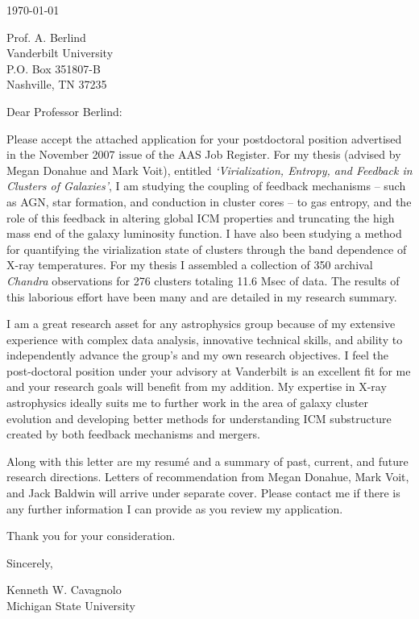 \documentclass[11pt]{article}
\begin{document}
\today

Prof. A. Berlind\\
Vanderbilt University\\
P.O. Box 351807-B\\
Nashville, TN 37235

Dear Professor Berlind:

Please accept the attached application for your postdoctoral
position advertised in the November 2007 issue of the AAS Job
Register. For my thesis (advised by Megan Donahue and  Mark Voit),
entitled {\it `Virialization, Entropy, and Feedback in Clusters of
Galaxies'}, I am studying the coupling of feedback mechanisms -- such
as AGN, star formation, and conduction in cluster cores -- to gas
entropy, and the role of this feedback in altering global ICM
properties and truncating the high mass end of the galaxy luminosity
function. I have also been studying a method for quantifying the
virialization state of clusters through the band dependence of X-ray
temperatures. For my thesis I assembled a collection of 350 archival
{\textit{Chandra}} observations for 276 clusters totaling 11.6 Msec of
data. The results of this laborious effort have been many and are
detailed in my research summary.

I am a great research asset for any astrophysics group because of my
extensive experience with complex data analysis, innovative technical
skills, and ability to independently advance the group's and my own
research objectives. I feel the post-doctoral position under your
advisory at Vanderbilt is an excellent fit for me and your research
goals will benefit from my addition. My expertise in X-ray
astrophysics ideally suits me to further work in the area of galaxy
cluster evolution and developing better methods for understanding ICM
substructure created by both feedback mechanisms and mergers.

Along with this letter are my resum\'{e} and a summary of past,
current, and future research directions. Letters of recommendation
from Megan Donahue, Mark Voit, and Jack Baldwin will arrive under
separate cover. Please contact me if there is any further information
I can provide as you review my application.

Thank you for your consideration.

Sincerely,\\
\begin{minipage}{7.5in}
\end{minipage}
Kenneth W. Cavagnolo\\
Michigan State University
\end{document}
